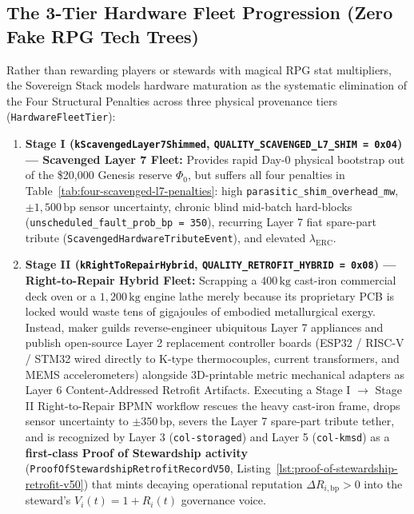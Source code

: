 \subsection{The 3-Tier Hardware Fleet Progression (Zero Fake RPG Tech Trees)}
\label{subsec:three-tier-hardware-fleet-progression}

Rather than rewarding players or stewards with magical RPG stat multipliers, the Sovereign Stack models hardware maturation as the systematic elimination of the Four Structural Penalties across three physical provenance tiers (\texttt{HardwareFleetTier}):

\begin{enumerate}
    \item \textbf{Stage I (\texttt{kScavengedLayer7Shimmed}, \texttt{QUALITY\_SCAVENGED\_L7\_SHIM = 0x04}) --- Scavenged Layer 7 Fleet:}
    Provides rapid Day-0 physical bootstrap out of the \$20,000 Genesis reserve $\Phi_0$, but suffers all four penalties in Table~\ref{tab:four-scavenged-l7-penalties}: high \texttt{parasitic\_shim\_overhead\_mw}, $\pm 1{,}500\,\mathrm{bp}$ sensor uncertainty, chronic blind mid-batch hard-blocks (\texttt{unscheduled\_fault\_prob\_bp = 350}), recurring Layer 7 fiat spare-part tribute (\texttt{ScavengedHardwareTributeEvent}), and elevated $\lambda_{\mathrm{ERC}}$.

    \item \textbf{Stage II (\texttt{kRightToRepairHybrid}, \texttt{QUALITY\_RETROFIT\_HYBRID = 0x08}) --- Right-to-Repair Hybrid Fleet:}
    Scrapping a $400\,\mathrm{kg}$ cast-iron commercial deck oven or a $1{,}200\,\mathrm{kg}$ engine lathe merely because its proprietary PCB is locked would waste tens of gigajoules of embodied metallurgical exergy. Instead, maker guilds reverse-engineer ubiquitous Layer 7 appliances and publish open-source Layer 2 replacement controller boards (ESP32 / RISC-V / STM32 wired directly to K-type thermocouples, current transformers, and MEMS accelerometers) alongside 3D-printable metric mechanical adapters as Layer 6 Content-Addressed Retrofit Artifacts. Executing a Stage I $\to$ Stage II Right-to-Repair BPMN workflow rescues the heavy cast-iron frame, drops sensor uncertainty to $\pm 350\,\mathrm{bp}$, severs the Layer 7 spare-part tribute tether, and is recognized by Layer 3 (\texttt{col-storaged}) and Layer 5 (\texttt{col-kmsd}) as a \textbf{first-class Proof of Stewardship activity} (\texttt{ProofOfStewardshipRetrofitRecordV50}, Listing~\ref{lst:proof-of-stewardship-retrofit-v50}) that mints decaying operational reputation $\Delta R_{i,\mathrm{bp}} > 0$ into the steward's $V_i(t) = 1 + R_i(t)$ governance voice.


\end{enumerate}
